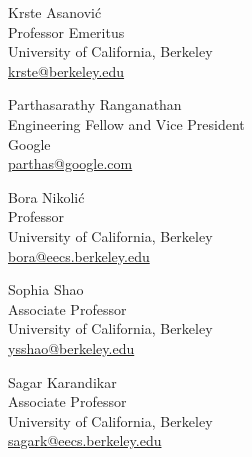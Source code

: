 \documentclass[line]{res}
\begin{document}
\begin{resume}
{\large{Krste Asanovi\'c}}
\\
Professor Emeritus
\\
University of California, Berkeley
\\
\href{mailto:krste@berkeley.edu}{krste@berkeley.edu}

{\large{Parthasarathy Ranganathan}}
\\
Engineering Fellow and Vice President
\\
Google
\\
\href{mailto:parthas@google.com}{parthas@google.com}

{\large{Bora Nikoli\'c}}
\\
Professor
\\
University of California, Berkeley
\\
\href{mailto:bora@eecs.berkeley.edu}{bora@eecs.berkeley.edu}

{\large{Sophia Shao}}
\\
Associate Professor
\\
University of California, Berkeley
\\
\href{mailto:ysshao@berkeley.edu}{ysshao@berkeley.edu}

{\large{Sagar Karandikar}}
\\
Associate Professor
\\
University of California, Berkeley
\\
\href{mailto:sagark@eecs.berkeley.edu}{sagark@eecs.berkeley.edu}

\end{resume}
\end{document}
